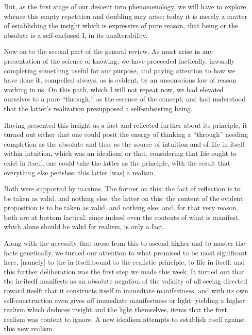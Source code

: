 But, as the first stage of our descent into phenomenology,
we will have to explore whence this
empty  repetition and doubling may arise;
today it is merely a matter of establishing the insight
which is expressive of pure reason, that being or the absolute is
a self-enclosed I, in its unalterability.

Now on to the second part of the general review.
As must arise in any presentation of the science of knowing,
we have proceeded factically, inwardly completing
something useful for our purpose,
and paying attention to how we have done it,
compelled always, as is evident, by
an unconscious law of reason working in us.
On this path, which I will not repeat now,
we had elevated ourselves to a pure “through,”
as the essence of the concept;
and had understood that the latter's realization
presupposed a self-subsisting being.

Having presented this insight as a fact
and reflected further about its principle,
it turned out either that one could posit
the energy of thinking a “through” needing
completion as the absolute
and thus as the source of intuition
and of life in itself within intuition,
which was an idealism;
or that, considering that life ought to exist in itself,
one could take the latter as the principle,
with the result that everything else perishes;
this latter [was] a realism.

Both were supported by maxims.
The former on this: the fact of reflection is
to be taken as valid, and nothing else;
the latter on this:
the content of the evident proposition is
to be taken as valid, and nothing else;
and, for that very reason, both are at bottom factical,
since indeed even the contents of what is manifest,
which alone should be valid for realism, is only a fact.

Along with the necessity that arose from this
to ascend higher and to master the facts genetically,
we turned our attention to what promised to be most significant here,
[namely] to the in-itself,bound to the realistic principle,
to life in itself:
and this further deliberation was the first step we made this week.
It turned out that the in-itself manifests as an absolute
negation of the validity of all seeing directed toward itself:
that it constructs itself in immediate manifestness,
and with its own self-construction even gives
off immediate manifestness or light:
yielding a higher realism which deduces
insight and the light themselves,
items that the first realism was content to ignore.
A new idealism attempts to establish itself
against this new realism.

